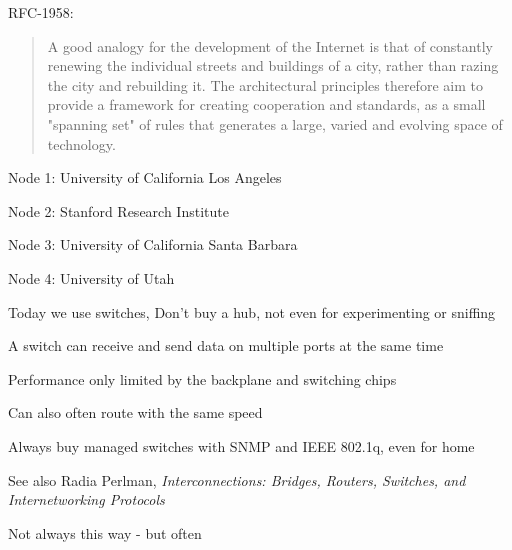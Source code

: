 \documentclass[Screen16to9,17pt]{foils}
\begin{document}
RFC-1958:
\begin{quote}
 A good analogy for the development of the Internet is that of
 constantly renewing the individual streets and buildings of a city,
 rather than razing the city and rebuilding it. The architectural
 principles therefore aim to provide a framework for creating
 cooperation and standards, as a small "spanning set" of rules that
 generates a large, varied and evolving space of technology.
\end{quote}


\begin{list2}
\item Node 1: University of California Los Angeles
\item Node 2: Stanford Research Institute
\item Node 3: University of California Santa Barbara
\item Node 4: University of Utah
\end{list2}





\begin{list1}
\item Today we use switches, Don't buy a hub, not even for experimenting or sniffing
\item A switch can receive and send data on multiple ports at the same time
\item Performance only limited by the backplane and switching chips
\item Can also often route with the same speed
\item Always buy managed switches with SNMP and IEEE 802.1q, even for home
\end{list1}




See also Radia Perlman, \emph{Interconnections: Bridges, Routers, Switches, and Internetworking Protocols}



\centerline{Not always this way - but often }
\end{document}
